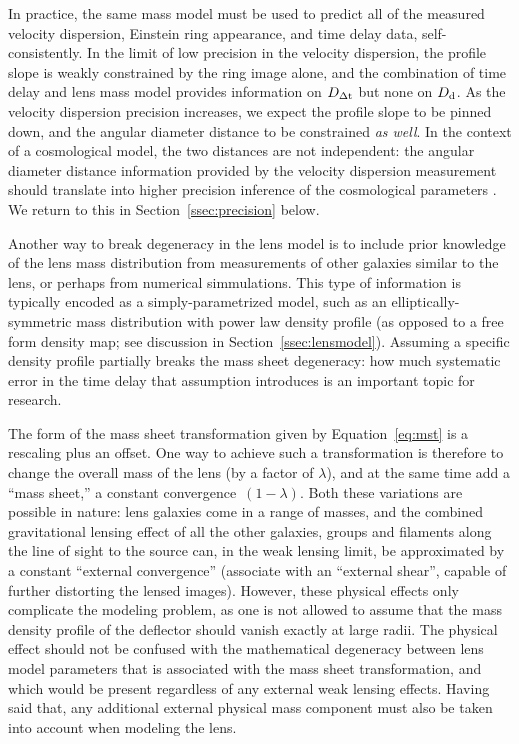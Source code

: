 In practice, the same mass model must be used to predict all of the
measured velocity dispersion, Einstein ring appearance, and time
delay data, self-consistently. In the limit of low precision in the
velocity dispersion, the profile slope is weakly constrained by the
ring image alone, and the combination of time delay and lens mass
model provides information on $D_{\Delta{\rm t}}$ but none on $D_{\rm d}$. As the
velocity dispersion precision increases, we expect the profile slope
to be pinned down, and the angular diameter distance to be constrained
{\it as well}. In the context of a cosmological model, the two
distances are not independent: the angular diameter distance
information provided by the velocity dispersion measurement should
translate into higher precision inference of the cosmological
parameters \citep{JeeEtal2016}.  We return to this in
Section~\ref{ssec:precision} below.

Another way to break degeneracy in the lens model is to include prior
knowledge of the lens mass distribution from measurements of other
galaxies similar to the lens, or perhaps from numerical
simmulations. This type of information is typically encoded as a
simply-parametrized model, such as an elliptically-symmetric mass
distribution with power law density profile (as opposed to a free form
density map; see discussion in Section~\ref{ssec:lensmodel}). Assuming
a specific density profile partially breaks the mass sheet degeneracy:
how much systematic error in the time delay
that assumption introduces is an important topic for research.


The form of the mass sheet transformation given by
Equation~\ref{eq:mst} is a rescaling plus an offset. One way to
achieve such a transformation is therefore to change the overall mass
of the lens (by a factor of $\lambda$), and at the same time add a
``mass sheet,'' a constant convergence~$(1-\lambda)$.  Both these
variations are possible in nature: lens galaxies come in a range of
masses, and the combined gravitational lensing effect of all the other
galaxies, groups and filaments along the line of sight to the source
can, in the weak lensing limit, be approximated by a constant
``external convergence'' (associate with an ``external shear'',
capable of further distorting the lensed images). However, these
physical effects only complicate the modeling problem, as one is not
allowed to assume that the mass density profile of the deflector
should vanish exactly at large radii.  The physical effect should not
be confused with the mathematical degeneracy between lens model
parameters that is associated with the mass sheet transformation, and
which would be present regardless of any external weak lensing
effects. Having said that, any additional external physical mass
component must also be taken into account when modeling the lens.

